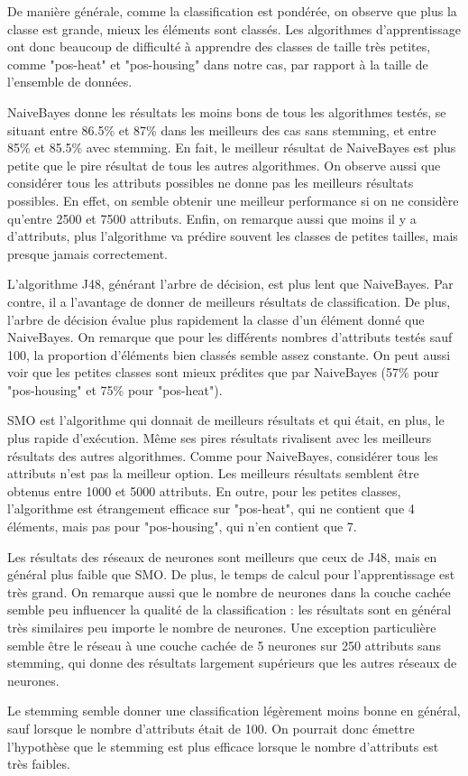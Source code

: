 \documentclass[11pt]{article} %
\begin{document}
De manière générale, comme la classification est pondérée, on observe que plus la classe est grande, mieux les éléments sont classés. Les algorithmes d'apprentissage ont donc beaucoup de difficulté à apprendre des classes de taille très petites, comme "pos-heat" et "pos-housing" dans notre cas, par rapport à la taille de l'ensemble de données.

NaiveBayes donne les résultats les moins bons de tous les algorithmes testés, se situant entre 86.5\% et 87\% dans les meilleurs des cas sans stemming, et entre 85\% et 85.5\% avec stemming. En fait, le meilleur résultat de NaiveBayes est plus petite que le pire résultat de tous les autres algorithmes. On observe aussi que considérer tous les attributs possibles ne donne pas les meilleurs résultats possibles. En effet, on semble obtenir une meilleur performance si on ne considère qu'entre 2500 et 7500 attributs. Enfin, on remarque aussi que moins il y a d'attributs, plus l'algorithme va prédire souvent les classes de petites tailles, mais presque jamais correctement.

L'algorithme J48, générant l'arbre de décision, est plus lent que NaiveBayes. Par contre, il a l'avantage de donner de meilleurs résultats de classification. De plus, l'arbre de décision évalue plus rapidement la classe d'un élément donné que NaiveBayes. On remarque que pour les différents nombres d'attributs testés sauf 100, la proportion d'éléments bien classés semble assez constante. On peut aussi voir que les petites classes sont mieux prédites que par NaiveBayes (57\% pour "pos-housing" et 75\% pour "pos-heat").

SMO est l'algorithme qui donnait de meilleurs résultats et qui était, en plus, le plus rapide d'exécution. Même ses pires résultats rivalisent avec les meilleurs résultats des autres algorithmes. Comme pour NaiveBayes, considérer tous les attributs n'est pas la meilleur option. Les meilleurs résultats semblent être obtenus entre 1000 et 5000 attributs. En outre, pour les petites classes, l'algorithme est étrangement efficace sur "pos-heat", qui ne contient que 4 éléments, mais pas pour "pos-housing", qui n'en contient que 7.

Les résultats des réseaux de neurones sont meilleurs que ceux de J48, mais en général plus faible que SMO. De plus, le temps de calcul pour l'apprentissage est très grand. On remarque aussi que le nombre de neurones dans la couche cachée semble peu influencer la qualité de la classification : les résultats sont en général très similaires peu importe le nombre de neurones. Une exception particulière semble être le réseau à une couche cachée de 5 neurones sur 250 attributs sans stemming, qui donne des résultats largement supérieurs que les autres réseaux de neurones.

Le stemming semble donner une classification légèrement moins bonne en général, sauf lorsque le nombre d'attributs était de 100. On pourrait donc émettre l'hypothèse que le stemming est plus efficace lorsque le nombre d'attributs est très faibles.
\end{document}

